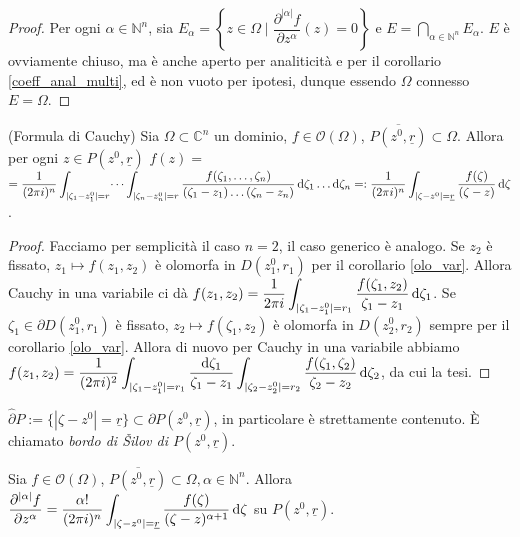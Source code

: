 \begin{proof}
  Per ogni $\alpha \in \mathbb{N}^n$, sia $E_\alpha=\left\{z \in \Omega \mid \dfrac{\partial^{|\alpha|} f}{\partial z^\alpha}(z)=0\right\}$ e $\displaystyle E=\bigcap_{\alpha \in \mathbb{N}^n} E_\alpha$.
  $E$ è ovviamente chiuso, ma è anche aperto per analiticità e per il corollario \ref{coeff_anal_multi}, ed è non vuoto per ipotesi, dunque essendo $\Omega$ connesso $E=\Omega$.
\end{proof}

\begin{prop}
  (Formula di Cauchy) Sia $\Omega \subset \mathbb{C}^n$ un dominio, $f \in \mathcal{O}(\Omega)$, $\overline{P(z^0,\underline{r})} \subset \Omega$. Allora per ogni $z \in P(z^0, \underline{r})$ $\displaystyle f(z)=$\\
  $\displaystyle =\dfrac{1}{(2\pi i)^n} \int_{|\zeta_1-z_1^0|=r}\dots\int_{|\zeta_n-z_n^0|=r} \frac{f(\zeta_1,\dots,\zeta_n)}{(\zeta_1-z_1)\dots(\zeta_n-z_n)}\mathop{}\!\mathrm{d}\zeta_1\dots\mathop{}\!\mathrm{d}\zeta_n=: \dfrac{1}{(2\pi i)^n} \int_{|\zeta-z^0|=\underline{r}} \dfrac{f(\zeta)}{(\zeta-z)}\mathop{}\!\mathrm{d} \zeta$.
\end{prop}

\begin{proof}
  Facciamo per semplicità il caso $n=2$, il caso generico è analogo. Se $z_2$ è fissato, $z_1 \longmapsto f(z_1, z_2)$ è olomorfa in $D(z^0_1, r_1)$ per il corollario \ref{olo_var}. Allora Cauchy in una variabile ci dà $\displaystyle f(z_1,z_2)=\frac{1}{2\pi i} \int_{|\zeta_1-z^0_1|=r_1} \frac{f(\zeta_1, z_2)}{\zeta_1-z_1}\mathop{}\!\mathrm{d}\zeta_1$.
  Se $\zeta_1 \in \partial D(z^0_1, r_1)$ è fissato, $z_2 \longmapsto f(\zeta_1,z_2)$ è olomorfa in $D(z^0_2, r_2)$ sempre per il corollario \ref{olo_var}.
  Allora di nuovo per Cauchy in una variabile abbiamo $\displaystyle f(z_1, z_2)=\frac{1}{(2\pi i)^2} \int_{|\zeta_1-z_1^0|=r_1} \frac{\mathop{}\!\mathrm{d} \zeta_1}{\zeta_1-z_1}\int_{|\zeta_2-z_2^0|=r_2} \frac{f(\zeta_1,\zeta_2)}{\zeta_2-z_2}\mathop{}\!\mathrm{d}\zeta_2$, da cui la tesi.
\end{proof}

\begin{oss}
  $\hat{\partial}P:=\{|\zeta-z^0|=\underline{r}\} \subset \partial P(z^0, \underline{r})$, in particolare è strettamente contenuto. È chiamato \textit{bordo di Šilov di $P(z^0, \underline{r})$}.
\end{oss}

\begin{cor}
  Sia $f \in \mathcal{O}(\Omega)$, $\overline{P(z^0, \underline{r})} \subset \Omega, \alpha \in \mathbb{N}^n$. Allora $\displaystyle \frac{\partial^{|\alpha|} f}{\partial z^\alpha}=\dfrac{\alpha!}{(2\pi i)^n} \int_{|\zeta-z^0|=\underline{r}} \frac{f(\zeta)}{(\zeta-z)^{\alpha+1}}\mathop{}\!\mathrm{d} \zeta$ su $P(z^0, \underline{r})$.
\end{cor}

